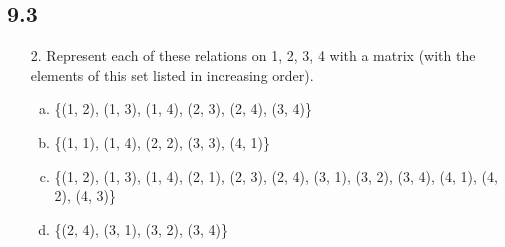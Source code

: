 \subsection{9.3}
\begin{itemize}
    \item[2.]  Represent each of these relations on {1, 2, 3, 4} with a
          matrix (with the elements of this set listed in increasing
          order).
          \begin{enumerate}[a.]
              \item \{(1, 2), (1, 3), (1, 4), (2, 3), (2, 4), (3, 4)\}
              \item \{(1, 1), (1, 4), (2, 2), (3, 3), (4, 1)\}
              \item \{(1, 2), (1, 3), (1, 4), (2, 1), (2, 3), (2, 4), (3, 1), (3, 2), (3, 4), (4, 1), (4, 2), (4, 3)\}
              \item \{(2, 4), (3, 1), (3, 2), (3, 4)\}
          \end{enumerate}
          \answer
          \begin{enumerate}[a.]


\end{enumerate}
\end{itemize}
